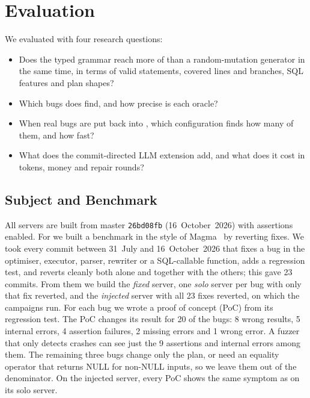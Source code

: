 \section{Evaluation}
\label{sec:eval}

We evaluated \tool with four research questions:
\begin{itemize}
  \item[\rqref{1}] Does the typed grammar reach more of \pg than a
    random-mutation generator in the same time, in terms of valid statements,
    covered lines and branches, SQL features and plan shapes?
  \item[\rqref{2}] Which bugs does \tool find, and how precise is each oracle?
  \item[\rqref{3}] When real bugs are put back into \pg, which configuration
    finds how many of them, and how fast?
  \item[\rqref{4}] What does the commit-directed LLM extension add, and what
    does it cost in tokens, money and repair rounds?
\end{itemize}

\subsection{Subject and Benchmark}
\label{sec:subjects}

All servers are built from \pg master \texttt{26bd08fb} (16~October~2026) with
assertions enabled. For  we built a benchmark in the style of
Magma~\cite{hazimeh2020magma} by reverting fixes. We took every commit between
31~July and 16~October~2026 that fixes a bug in the optimiser, executor, parser,
rewriter or a SQL-callable function, adds a regression test, and reverts cleanly
both alone and together with the others; this gave 23 commits. From them we
build the \emph{fixed} server, one \emph{solo} server per bug with only that fix
reverted, and the \emph{injected} server with all 23 fixes reverted, on which the
campaigns run. For each bug we wrote a proof of concept (PoC) from its
regression test. The PoC changes its result for 20 of the bugs: 8 wrong results,
5 internal errors, 4 assertion failures, 2 missing errors and 1 wrong error. A
fuzzer that only detects crashes can see just the 9 assertions and internal
errors among them. The remaining three bugs change only the plan, or need an
equality operator that returns NULL for non-NULL inputs, so we leave them out of
the denominator. On the injected server, every PoC shows the same symptom as on
its solo server.

